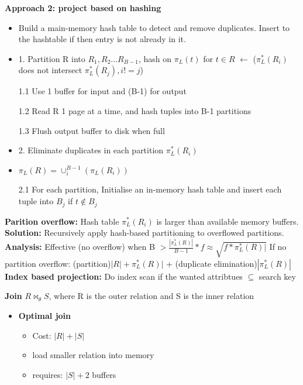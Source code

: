 \documentclass[10pt, landscape]{article}
\begin{document}
\begin{multicols}{4}
\textbf{Approach 2: project based on hashing}
\begin{itemize}
  \item Build a main-memory hash table to detect and remove duplicates. Insert to the hashtable if then entry is not already in it.
  \item 1. Partition R into $R_1, R_2...R_{B-1}$, hash on $\pi_L(t)$ for $t \in R$ $\leftarrow$ ($\pi^*_L(R_i)$ does not intersect $\pi^*_L(R_j), i!=j$)
  \item[1.1] Use 1 buffer for input and (B-1) for output
  \item[1.2] Read R 1 page at a time, and hash tuples into B-1 partitions
  \item[1.3] Flush output buffer to disk when full  
  \item 2. Eliminate duplicates in each partition $\pi^*_L(R_i)$
  \item $\pi_L(R)=\cup^{B-1}_i(\pi_L(R_i))$
  \item[2.1] For each partition, Initialise an in-memory hash table and insert each tuple into $B_j$ if $t \notin B_j$
\end{itemize}
\textbf{Parition overflow:} Hash table $\pi^*_L(R_i)$ is larger than available memory buffers. \newline
\textbf{Solution:} Recursively apply hash-based partitioning to overflowed partitions. \newline
\textbf{Analysis:} Effective (no overflow) when B $ > \frac{|\pi^*_L(R)|}{B-1} * f \approx \sqrt{f * \pi^*_L(R)|}$ \newline
If no partition overflow: (partition)$|R|+\pi^*_L(R)|$ + (duplicate elimination)$|\pi^*_L(R)|$ \newline
\textbf{Index based projection:} Do index scan if the wanted attribtues $\subseteq$ search key\newline

\textbf{Join} $R \Join_\theta S$, where R is the outer relation and S is the inner relation

\begin{multicols}{2}


    \begin{itemize}

      \item \textbf{Optimal join} \newline
      \begin{itemize}
        \item Cost: $|R| + |S|$
        \item load smaller relation into memory
        \item requires: $|S|+2$ buffers
      \end{itemize}


\end{itemize}
\end{multicols}
\end{multicols}
\end{document}
